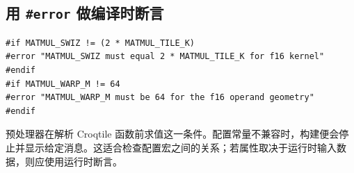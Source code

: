 \subsection*{用 \texttt{\#error} 做编译时断言}

\begin{lstlisting}[language=croqtile,caption={用 \#error 做编译时断言}]
#if MATMUL_SWIZ != (2 * MATMUL_TILE_K)
#error "MATMUL_SWIZ must equal 2 * MATMUL_TILE_K for f16 kernel"
#endif
#if MATMUL_WARP_M != 64
#error "MATMUL_WARP_M must be 64 for the f16 operand geometry"
#endif
\end{lstlisting}

预处理器在解析 Croqtile 函数前求值这一条件。配置常量不兼容时，构建便会停止并显示给定消息。这适合检查配置宏之间的关系；若属性取决于运行时输入数据，则应使用运行时断言。
